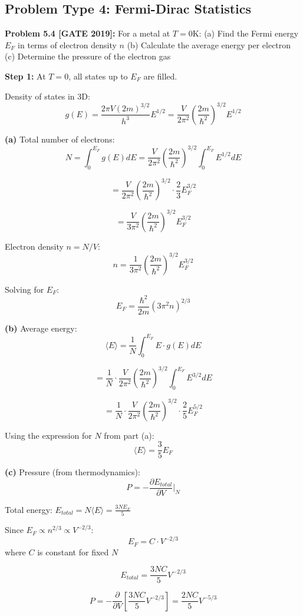 \documentclass[12pt,a4paper]{article}
\begin{document}
\subsection{Problem Type 4: Fermi-Dirac Statistics}

\textbf{Problem 5.4 [GATE 2019]:} For a metal at $T = 0$K:
(a) Find the Fermi energy $E_F$ in terms of electron density $n$
(b) Calculate the average energy per electron
(c) Determine the pressure of the electron gas

\begin{solution}
\textbf{Step 1:} At $T = 0$, all states up to $E_F$ are filled.

Density of states in 3D:
$$g(E) = \frac{2\pi V(2m)^{3/2}}{h^3}E^{1/2} = \frac{V}{2\pi^2}\left(\frac{2m}{\hbar^2}\right)^{3/2}E^{1/2}$$

\textbf{(a)} Total number of electrons:
$$N = \int_0^{E_F} g(E)dE = \frac{V}{2\pi^2}\left(\frac{2m}{\hbar^2}\right)^{3/2} \int_0^{E_F} E^{1/2}dE$$

$$= \frac{V}{2\pi^2}\left(\frac{2m}{\hbar^2}\right)^{3/2} \cdot \frac{2}{3}E_F^{3/2}$$

$$= \frac{V}{3\pi^2}\left(\frac{2m}{\hbar^2}\right)^{3/2} E_F^{3/2}$$

Electron density $n = N/V$:
$$n = \frac{1}{3\pi^2}\left(\frac{2m}{\hbar^2}\right)^{3/2} E_F^{3/2}$$

Solving for $E_F$:
$$E_F = \frac{\hbar^2}{2m}(3\pi^2 n)^{2/3}$$

\textbf{(b)} Average energy:
$$\langle E \rangle = \frac{1}{N}\int_0^{E_F} E \cdot g(E)dE$$

$$= \frac{1}{N} \cdot \frac{V}{2\pi^2}\left(\frac{2m}{\hbar^2}\right)^{3/2} \int_0^{E_F} E^{3/2}dE$$

$$= \frac{1}{N} \cdot \frac{V}{2\pi^2}\left(\frac{2m}{\hbar^2}\right)^{3/2} \cdot \frac{2}{5}E_F^{5/2}$$

Using the expression for $N$ from part (a):
$$\langle E \rangle = \frac{3}{5}E_F$$

\textbf{(c)} Pressure (from thermodynamics):
$$P = -\frac{\partial E_{total}}{\partial V}\Big|_N$$

Total energy: $E_{total} = N\langle E \rangle = \frac{3NE_F}{5}$

Since $E_F \propto n^{2/3} \propto V^{-2/3}$:
$$E_F = C \cdot V^{-2/3}$$ where $C$ is constant for fixed $N$

$$E_{total} = \frac{3NC}{5}V^{-2/3}$$

$$P = -\frac{\partial}{\partial V}\left[\frac{3NC}{5}V^{-2/3}\right] = \frac{2NC}{5}V^{-5/3}$$


\end{solution}
\end{document}
